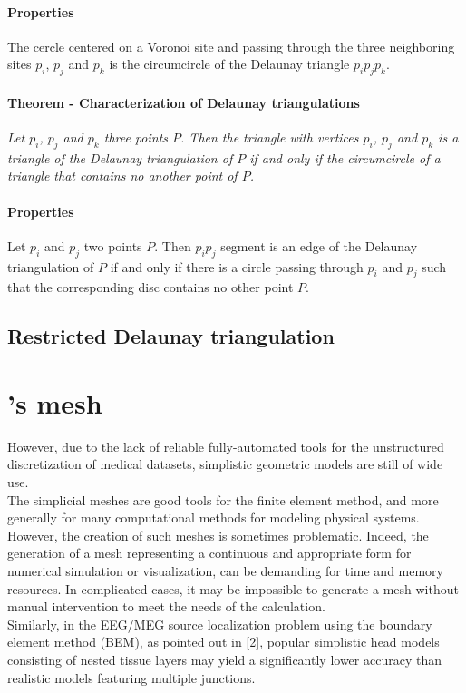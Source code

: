 \paragraph{Properties}
{
The cercle centered on a Voronoi site and passing through the three neighboring sites $p_{i}$, $p_{j}$ and $p_{k}$ is the circumcircle of the Delaunay triangle $p_{i}p_{j}p_{k}$.
}


\paragraph{Theorem - Characterization of Delaunay triangulations}
{
\it Let $p_{i}$, $p_{j}$ and $p_{k}$ three points $P$. Then the triangle with vertices $p_{i}$, $p_{j}$ and $p_{k}$ is a triangle of the Delaunay triangulation of $P$ if and only if the circumcircle of a triangle that contains no another point of $P$.
}

\paragraph{Properties}
{
Let $p_{i}$ and $p_{j}$ two points $P$. Then $p_{i}p_{j}$ segment is an edge of the Delaunay triangulation of $P$ if and only if there is a circle passing through $p_{i}$ and $p_{j}$ such that the corresponding disc contains no other point $P$.
}

\subsection{Restricted Delaunay triangulation}

\newpage{}


\section{\FIJEE{}'s mesh}

However, due to the lack of reliable fully-automated tools for the unstructured discretization of medical datasets, simplistic geometric models are still of wide use. \\
The simplicial meshes are good tools for the finite element method, and more generally for many computational methods for modeling physical systems. However, the creation of such meshes is sometimes problematic. Indeed, the generation of a mesh representing a continuous and appropriate form for numerical simulation or visualization, can be demanding for time and memory resources. In complicated cases, it may be impossible to generate a mesh without manual intervention to meet the needs of the calculation.\\
Similarly, in the EEG/MEG source localization problem using the boundary element method (BEM), as pointed out in [2], popular simplistic head models consisting of nested tissue layers may yield a significantly lower accuracy than realistic models featuring multiple junctions.\\


